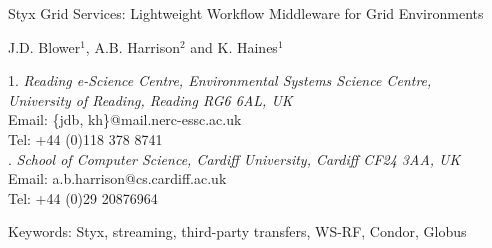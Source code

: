 \documentclass[a4paper]{article}
\begin{document}

\begin{center}
{\Large Styx Grid Services: Lightweight Workflow Middleware for Grid Environments}

\bigskip
\bigskip

{\large J.D. Blower$^{1}$, A.B. Harrison$^{2}$ and K. Haines$^{1}$}

\bigskip

{\small 1. \textit{Reading e-Science Centre, Environmental Systems Science Centre, \\
University of Reading, Reading RG6 6AL, UK} \\
Email: \{jdb, kh\}@mail.nerc-essc.ac.uk\\
Tel: +44 (0)118 378 8741 \\
. \textit{School of Computer Science, Cardiff University, Cardiff CF24 3AA, UK}\\
Email: a.b.harrison@cs.cardiff.ac.uk\\
Tel: +44 (0)29 20876964}

\bigskip
\bigskip

Keywords: Styx, streaming, third-party transfers, WS-RF, Condor, Globus

\end{center}


\begin{abstract}
The service-oriented approach to performing distributed scientific research is potentially very powerful but is not yet widely used in many scientific fields.  This is partly due to the technical difficulties involved in creating services and composing them into workflows.  We present the Styx Grid Service, a simple system that wraps command-line programs and allows them to be run over the Internet exactly as if they were local programs.  Styx Grid Services are very easy to create and use and can be composed into powerful workflows with simple shell scripts or more sophisticated graphical tools.  Data can be streamed directly from service to service and progress can be monitored asynchronously using a mechanism that places very few demands on firewalls.  Styx Grid Services can be used as an easy-to-use, uniform interface to Condor and Globus resources, permitting the creation of workflows that span various Grid resources and can be integrated with Web Services and the WS-RF specification.
\end{abstract}
\end{document}
